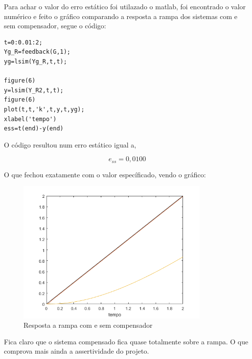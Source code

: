 Para achar o valor do erro estático foi utilazado o matlab, foi encontrado o valor numérico e feito o gráfico comparando a resposta a rampa dos sistemas com e sem compensador, segue o código:

\begin{lstlisting}[style=matlab]
t=0:0.01:2;
Yg_R=feedback(G,1);
yg=lsim(Yg_R,t,t);

figure(6)
y=lsim(Y_R2,t,t);
figure(6)
plot(t,t,'k',t,y,t,yg);
xlabel('tempo')
ess=t(end)-y(end)
\end{lstlisting}\vspace{0.2cm}

O código resultou num erro estático igual a,

{\color{red} \[\boxed{e_{ss} = 0,0100}\]}

O que fechou exatamente com o valor específicado, vendo o gráfico:

\begin{figure}[H]
  \centering
  \includegraphics[width=0.85\textwidth]{images/fig7.png}
  \caption{Resposta a rampa com e sem compensador}
\end{figure}

Fica claro que o sistema compensado fica quase totalmente sobre a rampa. O que comprova mais ainda a assertividade do projeto. \newpage






























